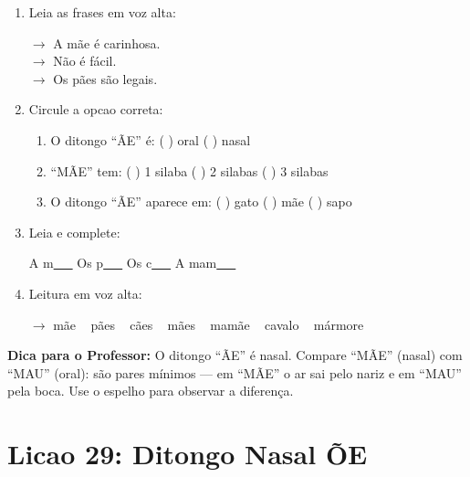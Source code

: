 \begin{exercicio}
\begin{enumerate}[resume]
  \item Leia as frases em voz alta:
  \begin{center}
  $\rightarrow$ A m\~ae \'e carinhosa.\\
  $\rightarrow$ N\~ao \'e f\'acil.\\
  $\rightarrow$ Os p\~aes s\~ao legais.
  \end{center}

  \item Circule a opcao correta:
  \begin{enumerate}[label=(\alph*)]
    \item O ditongo ``\~AE'' \'e: ( ) oral ( ) nasal
    \item ``M\~AE'' tem: ( ) 1 silaba ( ) 2 silabas ( ) 3 silabas
    \item O ditongo ``\~AE'' aparece em: ( ) gato ( ) m\~ae ( ) sapo
  \end{enumerate}

  \item Leia e complete:
  \begin{center}
  A m\underline{~~~} \quad Os p\underline{~~~} \quad Os c\underline{~~~} \quad A mam\underline{~~~}
  \end{center}

  \item Leitura em voz alta:
  \begin{center}
  $\rightarrow$ m\~ae  ~  p\~aes  ~  c\~aes  ~  m\~aes  ~  mam\~ae  ~  cavalo  ~  m\'armore
  \end{center}
\end{enumerate}
\end{exercicio}

\begin{dica}
\textbf{Dica para o Professor:} O ditongo ``\~AE'' \'e nasal. Compare ``M\~AE'' (nasal) com ``MAU'' (oral): s\~ao pares m\'inimos --- em ``M\~AE'' o ar sai pelo nariz e em ``MAU'' pela boca. Use o espelho para observar a diferen\c{c}a.
\end{dica}

\section{Licao 29: Ditongo Nasal \~OE}

\rotinasimples
{}


